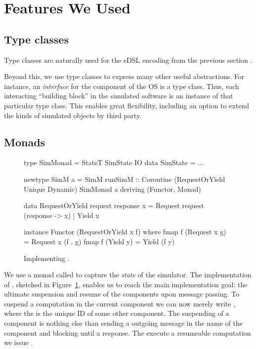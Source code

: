 \section{Features We Used}
\label{sec:impl-detail}


\subsection{Type classes}

Type classes are naturally used for the eDSL encoding from the previous section \cite{Hall:1996:TCH:227699.227700,final_tagless_embedding}.

Beyond this, we use type classes to express many other useful abstractions.
For instance, an \emph{interface} for the component of the OS is a type class.
Thus, each interacting ``building block'' in the simulated software is an instance of that particular type class.
This enables great flexibility, including an option to extend the kinds of simulated objects by third party.

\subsection{Monads}
\label{sec:impl-monads}
\begin{figure}
\centering
\begin{code*}
type SimMonad =  StateT SimState IO
data SimState = ...

newtype SimM a
  = SimM { runSimM :: Coroutine
      (RequestOrYield Unique Dynamic)
      SimMonad a }
    deriving (Functor, Monad)

data RequestOrYield request response x
  = Request request (response -> x)
  | Yield   x

instance Functor (RequestOrYield x f) where
  fmap f (Request x g) = Request x (f . g)
  fmap f (Yield y)     = Yield (f y)
\end{code*}
\caption{Implementing .}
\label{fig:code-simm}
\end{figure}

We use a monad called  to capture the \emph{state} of the simulator.
The implementation of , sketched in Figure~\ref{fig:code-simm}, enables us to reach the main implementation goal: the ultimate suspension and resume of the components upon message passing.
To suspend a computation in the current component we can now merely write , where the  is the unique ID of some other component.
The suspending of a component is nothing else than sending a outgoing message in the name of the component and blocking until a response.
The execute a resumeable computation we issue .


